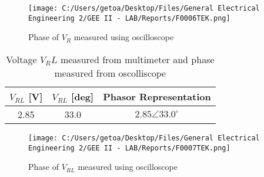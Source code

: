 \documentclass[12pt]{report}
\begin{document}
\begin{figure}[ht]
  \centering
  \texttt{[image: C:/Users/getoa/Desktop/Files/General Electrical Engineering 2/GEE II - LAB/Reports/F0006TEK.png]}
  \caption{Phase of $V_R$ measured using oscilloscope}
\end{figure} 
\begin{table}[!ht]
\centering
\begin{minipage}{0.8\linewidth}
\centering
\begin{tabular}{|c|c|c|}
\hline
\rowcolor{lightblue} $V_{RL} $ [V] & $V_{RL} $ [deg] & Phasor Representation\\
\hline
2.85 & 33.0 & $2.85 \angle 33.0^\circ $ \\
\hline
\end{tabular}
\caption{Voltage $V_RL$ measured from multimeter and phase measured from oscolliscope}
\label{tab:example}
\end{minipage}
\end{table}
\begin{figure}
  \centering
  \texttt{[image: C:/Users/getoa/Desktop/Files/General Electrical Engineering 2/GEE II - LAB/Reports/F0007TEK.png]}
  \caption{Phase of $V_{RL}$ measured using oscilloscope}
\end{figure} 
\end{document}
